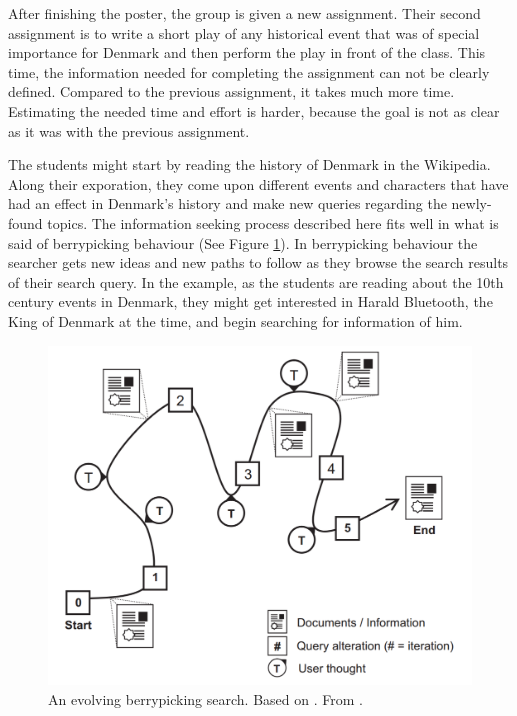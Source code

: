 After finishing the poster, the group is given a new assignment.
Their second assignment is to write a short play of any historical event that was of special importance for Denmark and then perform the play in front of the class.
This time, the information needed for completing the assignment can not be clearly defined. 
Compared to the previous assignment, it takes much more time.
Estimating the needed time and effort is harder, because the goal is not as clear as it was with the previous assignment.

The students might start by reading the history of Denmark in the Wikipedia.
Along their exporation, they come upon different events and characters that have had an effect in Denmark's history and make new queries regarding the newly-found topics.
The information seeking process described here fits well in what is said of berrypicking behaviour (See Figure \ref{figure_bp}).
In berrypicking behaviour the searcher gets new ideas and new paths to follow as they browse the search results of their search query. In the example, as the students are reading about the 10th century events in Denmark, they might get interested in Harald Bluetooth, the King of Denmark at the time, and begin searching for information of him.  

\begin{figure}[htp] %
\caption{An evolving berrypicking search. Based on \protect\cite{bates89}. From \protect\cite{march06}.}
\label{figure_bp}
\centering
\includegraphics[scale=0.25]{figures/berrypicking.pdf}
\end{figure}

